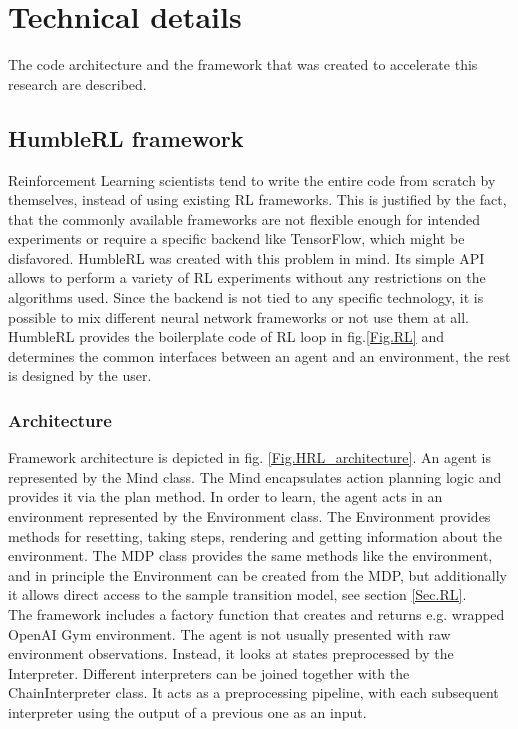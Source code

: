 \section{Technical details}

The code architecture and the framework that was created to accelerate this research are described.

\subsection{HumbleRL framework}

Reinforcement Learning scientists tend to write the entire code from scratch by themselves, instead of using existing RL frameworks. This is justified by the fact, that the commonly available frameworks are not flexible enough for intended experiments or require a specific backend like TensorFlow, which might be disfavored.
HumbleRL \cite{Code.HRL} was created with this problem in mind. Its simple API allows to perform a variety of RL experiments without any restrictions on the algorithms used. Since the backend is not tied to any specific technology, it is possible to mix different neural network frameworks or not use them at all. HumbleRL provides the boilerplate code of RL loop in fig.\ref{Fig.RL} and determines the common interfaces between an agent and an environment, the rest is designed by the user.

\subsubsection{Architecture}

Framework architecture is depicted in fig. \ref{Fig.HRL_architecture}. An agent is represented by the Mind class. The Mind encapsulates action planning logic and provides it via the plan method. In order to learn, the agent acts in an environment represented by the Environment class. The Environment provides methods for resetting, taking steps, rendering and getting information about the environment. The MDP class provides the same methods like the environment, and in principle the Environment can be created from the MDP, but additionally it allows direct access to the sample transition model, see section \ref{Sec.RL}. \\
The framework includes a factory function that creates and returns e.g. wrapped OpenAI Gym environment. The agent is not usually presented with raw environment observations. Instead, it looks at states preprocessed by the Interpreter. Different interpreters can be joined together with the ChainInterpreter class. It acts as a preprocessing pipeline, with each subsequent interpreter using the output of a previous one as an input.

